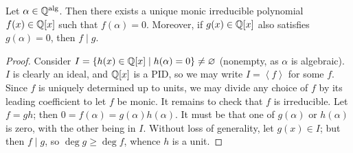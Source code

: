\begin{proposition} \label{prop:minimal_poly}
    Let $\alpha \in \mathbb Q^{\operatorname{alg}}$. Then there exists a unique monic irreducible polynomial $f(x) \in \mathbb Q[x]$ such that $f(\alpha) = 0$. Moreover, if $g(x) \in \mathbb Q[x]$ also satisfies $g(\alpha) = 0$, then $f \mid g$.
\end{proposition}
\begin{proof}
    Consider $I = \{h(x) \in \mathbb Q[x] \mid h(\alpha) = 0\} \neq \varnothing$ (nonempty, as $\alpha$ is algebraic). $I$ is clearly an ideal, %
    and $\mathbb Q[x]$ is a PID, so we may write $I = \left<f\right>$ for some $f$. Since $f$ is uniquely determined up to units, we may divide any choice of $f$ by its leading coefficient to let $f$ be monic. It remains to check that $f$ is irreducible. Let $f = gh$; then $0 = f(\alpha) = g(\alpha) h(\alpha)$. It must be that one of $g(\alpha)$ or $h(\alpha)$ is zero, with the other being in $I$. Without loss of generality, let $g(x) \in I$; but then $f \mid g$, so $\deg g \geq \deg f$, whence $h$ is a unit.
\end{proof}